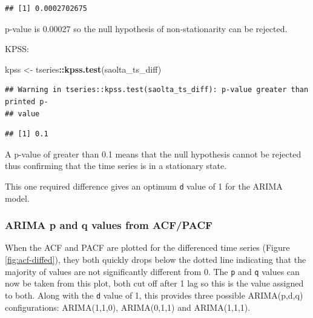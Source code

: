 \documentclass[
  12pt,
]{article}
\newenvironment{Shaded}{\begin{snugshade}}{\end{snugshade}}
\newcommand{\KeywordTok}[1]{\textcolor[rgb]{0.13,0.29,0.53}{\textbf{#1}}}
\newcommand{\NormalTok}[1]{#1}
\newcommand{\OperatorTok}[1]{\textcolor[rgb]{0.81,0.36,0.00}{\textbf{#1}}}
\newcommand{\StringTok}[1]{\textcolor[rgb]{0.31,0.60,0.02}{#1}}
\begin{document}
\begin{verbatim}
## [1] 0.0002702675
\end{verbatim}

\normalsize

p-value is 0.00027 so the null hypothesis of non-stationarity can be rejected.

\newpage

KPSS:
\small

\begin{Shaded}
\begin{Highlighting}[]
\NormalTok{kpss \textless{}{-}}\StringTok{ }\NormalTok{tseries}\OperatorTok{::}\KeywordTok{kpss.test}\NormalTok{(saolta\_ts\_diff)}
\end{Highlighting}
\end{Shaded}

\begin{verbatim}
## Warning in tseries::kpss.test(saolta_ts_diff): p-value greater than printed p-
## value
\end{verbatim}

\begin{Shaded}
\end{Shaded}

\begin{verbatim}
## [1] 0.1
\end{verbatim}

\normalsize

A p-value of greater than 0.1 means that the null hypothesis cannot be rejected thus confirming that the time series is in a stationary state.

This one required difference gives an optimum \texttt{d} value of 1 for the ARIMA model.

\hypertarget{arima-p-and-q-values-from-acfpacf}{%
\subsubsection{ARIMA p and q values from ACF/PACF}\label{arima-p-and-q-values-from-acfpacf}}

When the ACF and PACF are plotted for the differenced time series (Figure \ref{fig:acf-diffed}), they both quickly drops below the dotted line indicating that the majority of values are not significantly different from 0. The \texttt{p} and \texttt{q} values can now be taken from this plot, both cut off after 1 lag so this is the value assigned to both. Along with the \texttt{d} value of 1, this provides three possible ARIMA(p,d,q) configurations: ARIMA(1,1,0), ARIMA(0,1,1) and ARIMA(1,1,1).
\end{document}
